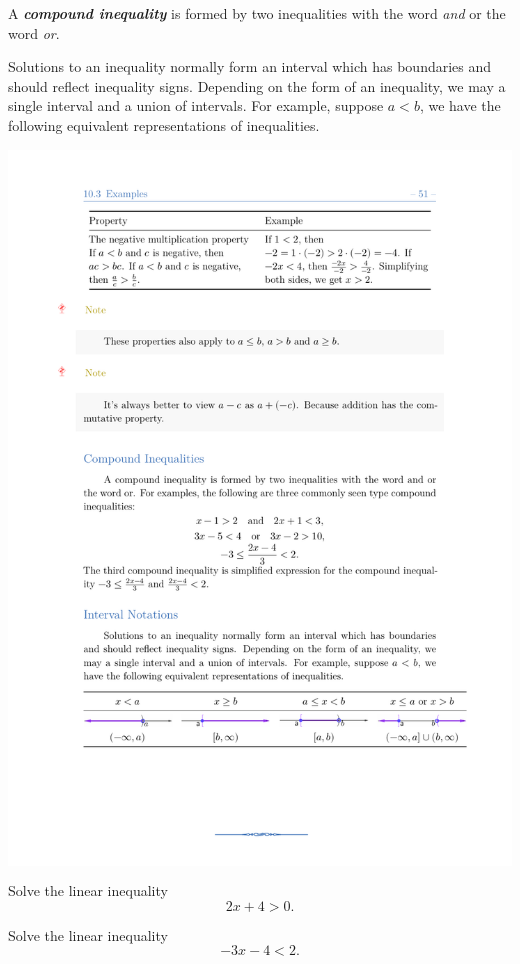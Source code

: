 A \textbf{\emph{compound inequality}} is formed by two inequalities with
the word \emph{and} or the word \emph{or}.

Solutions to an inequality normally form an interval which has
boundaries and should reflect inequality signs. Depending on the form of
an inequality, we may a single interval and a union of intervals. For
example, suppose \(a<b\), we have the following equivalent
representations of inequalities.

\begin{fullwidth}
  \raggedleft
  \colorbox{white}{
    \includegraphics[width=0.8\linewidth]{figs/linear-inequalities.pdf}
  }
\end{fullwidth}

\begin{example}

Solve the linear inequality \[
2x+4>0.
\]

\end{example}
\vspace*{6\baselineskip}

\begin{example}

Solve the linear inequality \[
-3x-4<2.
\]

\end{example}
\vspace*{6\baselineskip}

